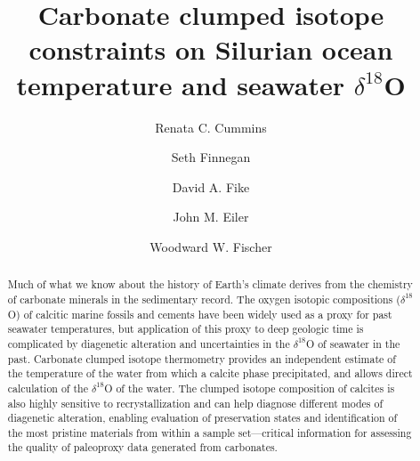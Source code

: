 \documentclass[preprint, authoryear]{elsarticle}
\begin{document}
\begin{frontmatter}

\title{Carbonate clumped isotope constraints on Silurian ocean temperature and seawater $\delta^{18}$O}

\author[caltech]{Renata C. Cummins}

\author[berkley]{Seth Finnegan}

\author[washU]{David A. Fike}

\author[caltech]{John M. Eiler}

\author[caltech]{Woodward W. Fischer}


\address[caltech]{California Institute of Technology, Geological and Planetary Sciences, MC 100-23, Pasadena, CA 91125}

\address[berkley]{Department of Integrative Biology, University of California, 1005 Valley Life Sciences Bldg \#3140, Berkeley, CA 94720}

\address[washU]{Department of Earth and Planetary Sciences, Washington University, St. Louis, Missouri 63130}


\begin{abstract}

Much of what we know about the history of Earth's climate derives from the chemistry of carbonate minerals in the sedimentary record. The oxygen isotopic compositions ($\delta^{18}$O) of calcitic marine fossils and cements have been widely used as a proxy for past seawater temperatures, but application of this proxy to deep geologic time is complicated by diagenetic alteration and uncertainties in the $\delta^{18}$O of seawater in the past. Carbonate clumped isotope thermometry provides an independent estimate of the temperature of the water from which a calcite phase precipitated, and allows direct calculation of the $\delta^{18}$O of the water. The clumped isotope composition of calcites is also highly sensitive to recrystallization and can help diagnose different modes of diagenetic alteration, enabling evaluation of preservation states and identification of the most pristine materials from within a sample set---critical information for assessing the quality of paleoproxy data generated from carbonates. 


\end{abstract}
\end{frontmatter}
\end{document}
